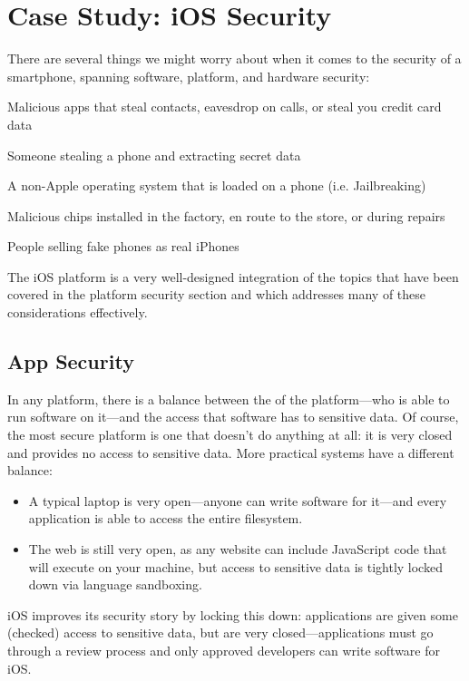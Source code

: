 \chapter{Case Study: iOS Security}

There are several things we might worry about when it comes to the security of a smartphone, spanning software, platform, and hardware security:

\begin{compactitem}
	\item Malicious apps that steal contacts, eavesdrop on calls, or steal you credit card data
	\item Someone stealing a phone and extracting secret data
	\item A non-Apple operating system that is loaded on a phone (i.e. Jailbreaking)
	\item Malicious chips installed in the factory, en route to the store, or during repairs
	\item People selling fake phones as real iPhones
\end{compactitem}

The iOS platform is a very well-designed integration of the topics that have been covered in the platform security section and which addresses many of these considerations effectively.

\section{App Security}
In any platform, there is a balance between the  of the platform---who is able to run software on it---and the access that software has to sensitive data. Of course, the most secure platform is one that doesn't do anything at all: it is very closed and provides no access to sensitive data. More practical systems have a different balance:

\begin{itemize}
	\item A typical laptop is very open---anyone can write software for it---and every application is able to access the entire filesystem.
	\item The web is still very open, as any website can include JavaScript code that will execute on your machine, but access to sensitive data is tightly locked down via language sandboxing.
\end{itemize}

iOS improves its security story by locking this down: applications are given some (checked) access to sensitive data, but are very closed---applications must go through a review process and only approved developers can write software for iOS.

